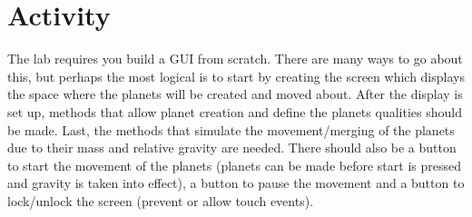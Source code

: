 \section{Activity}

The lab requires you build a GUI from scratch.
There are many ways to go about this, but perhaps the most logical is to start by creating the screen which displays the space where the planets will be created and moved about.
After the display is set up, methods that allow planet creation and define the planets qualities should be made.
Last, the methods that simulate the movement/merging of the planets due to their mass and relative gravity are needed.
There should also be a button to start the movement of the planets (planets can be made before start is pressed and gravity is taken into effect), a button to pause the movement and a button to lock/unlock the screen (prevent or allow touch events). 